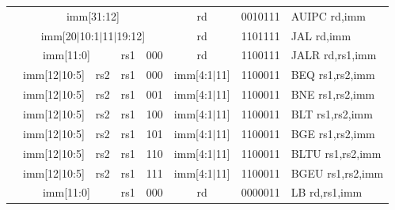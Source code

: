 \documentclass[11pt]{article}
\begin{document}
{\begin{table}[H]
\begin{small}
\begin{center}
\begin{tabular}{p{0in}p{0.4in}p{0.05in}p{0.05in}p{0.05in}p{0.05in}p{0.4in}p{0.6in}p{0.4in}p{0.6in}p{0.7in}l}
&
\multicolumn{8}{|c|}{imm[31:12]} &
\multicolumn{1}{c|}{rd} &
\multicolumn{1}{c|}{0010111} & AUIPC rd,imm \\
\cline{2-11}


&
\multicolumn{8}{|c|}{imm[20$\vert$10:1$\vert$11$\vert$19:12]} &
\multicolumn{1}{c|}{rd} &
\multicolumn{1}{c|}{1101111} & JAL rd,imm \\
\cline{2-11}


&
\multicolumn{6}{|c|}{imm[11:0]} &
\multicolumn{1}{c|}{rs1} &
\multicolumn{1}{c|}{000} &
\multicolumn{1}{c|}{rd} &
\multicolumn{1}{c|}{1100111} & JALR rd,rs1,imm \\
\cline{2-11}


&
\multicolumn{4}{|c|}{imm[12$\vert$10:5]} &
\multicolumn{2}{c|}{rs2} &
\multicolumn{1}{c|}{rs1} &
\multicolumn{1}{c|}{000} &
\multicolumn{1}{c|}{imm[4:1$\vert$11]} &
\multicolumn{1}{c|}{1100011} & BEQ rs1,rs2,imm \\
\cline{2-11}


&
\multicolumn{4}{|c|}{imm[12$\vert$10:5]} &
\multicolumn{2}{c|}{rs2} &
\multicolumn{1}{c|}{rs1} &
\multicolumn{1}{c|}{001} &
\multicolumn{1}{c|}{imm[4:1$\vert$11]} &
\multicolumn{1}{c|}{1100011} & BNE rs1,rs2,imm \\
\cline{2-11}


&
\multicolumn{4}{|c|}{imm[12$\vert$10:5]} &
\multicolumn{2}{c|}{rs2} &
\multicolumn{1}{c|}{rs1} &
\multicolumn{1}{c|}{100} &
\multicolumn{1}{c|}{imm[4:1$\vert$11]} &
\multicolumn{1}{c|}{1100011} & BLT rs1,rs2,imm \\
\cline{2-11}


&
\multicolumn{4}{|c|}{imm[12$\vert$10:5]} &
\multicolumn{2}{c|}{rs2} &
\multicolumn{1}{c|}{rs1} &
\multicolumn{1}{c|}{101} &
\multicolumn{1}{c|}{imm[4:1$\vert$11]} &
\multicolumn{1}{c|}{1100011} & BGE rs1,rs2,imm \\
\cline{2-11}


&
\multicolumn{4}{|c|}{imm[12$\vert$10:5]} &
\multicolumn{2}{c|}{rs2} &
\multicolumn{1}{c|}{rs1} &
\multicolumn{1}{c|}{110} &
\multicolumn{1}{c|}{imm[4:1$\vert$11]} &
\multicolumn{1}{c|}{1100011} & BLTU rs1,rs2,imm \\
\cline{2-11}


&
\multicolumn{4}{|c|}{imm[12$\vert$10:5]} &
\multicolumn{2}{c|}{rs2} &
\multicolumn{1}{c|}{rs1} &
\multicolumn{1}{c|}{111} &
\multicolumn{1}{c|}{imm[4:1$\vert$11]} &
\multicolumn{1}{c|}{1100011} & BGEU rs1,rs2,imm \\
\cline{2-11}


&
\multicolumn{6}{|c|}{imm[11:0]} &
\multicolumn{1}{c|}{rs1} &
\multicolumn{1}{c|}{000} &
\multicolumn{1}{c|}{rd} &
\multicolumn{1}{c|}{0000011} & LB rd,rs1,imm \\
\cline{2-11}



\end{tabular}
\end{center}
\end{small}
\end{table}}
\end{document}
